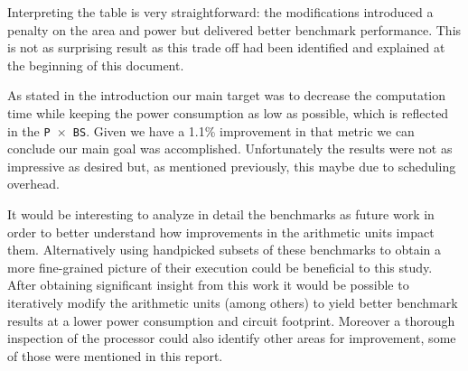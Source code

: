 Interpreting the table is very straightforward: the modifications introduced a penalty on the area and power but delivered better benchmark performance. This is not as surprising result as this trade off had been identified and explained at the beginning of this document.

As stated in the introduction our main target was to decrease the computation time while keeping the power consumption as low as possible, which is reflected in the \texttt{P $\times$ BS}. Given we have a 1.1\% improvement in that metric we can conclude our main goal was accomplished. Unfortunately the results were not as impressive as desired but, as mentioned previously, this maybe due to scheduling overhead.

It would be interesting to analyze in detail the benchmarks as future work in order to better understand how improvements in the arithmetic units impact them. Alternatively using handpicked subsets of these benchmarks to obtain a more fine-grained picture of their execution could be beneficial to this study. After obtaining significant insight from this work it would be possible to iteratively modify the arithmetic units (among others) to yield better benchmark results at a lower power consumption and circuit footprint.
Moreover a thorough inspection of the processor could also identify other areas for improvement, some of those were mentioned in this report. 
